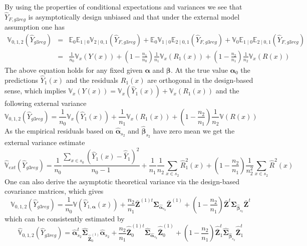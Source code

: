 \documentclass[a4paper,12pt,leqno, titlepage]{article}
\newcommand{\EX}{\mathbb{E}}
\newcommand{\VAR}{\mathbb{V}}
\begin{document}
By using the properties of conditional expectations and variances  we see that
$\hat{Y}_{F,g3reg}$ is asymptotically design unbiased and that under the external model assumption
one has
\begin{eqnarray}\label{extvaryg3reg1}
\VAR_{0,1,2}(\hat{Y}_{g3reg})&=&\EX_0 \EX_{1 \mid 0}\VAR_{2 \mid 0,1}(\hat{Y}_{F,g3reg})+
\EX_0 \VAR_{1 \mid 0}\EX_{2 \mid 0,1}(\hat{Y}_{F,g3reg})
+\VAR_0 \EX_{1 \mid 0}\EX_{2 \mid 0,1}(\hat{Y}_{F,g3reg})\nonumber \\
&=& \frac{1}{n_0}\VAR_{x}(Y(x))+(1-\frac{n_1}{n_0})\frac{1}{n_1}\VAR_x(R_1(x))+
(1-\frac{n_2}{n_1})\frac{1}{n_2}\VAR_x(R(x))
\end{eqnarray}
The above equation holds for any fixed given $\pmb{\alpha}$ and $\pmb{\beta}$. At the true  value $\pmb{\alpha}_0$ the predictions $\hat{Y}_1(x)$ and the residuals $R_1(x)$ are orthogonal in the design-based sense, which implies $\VAR_x(Y(x))=\VAR_x(\hat{Y}_1(x))+\VAR_x(R_1(x))$ and the following external variance
\begin{equation}\label{theoreticalexternalvaryg3reg}
\VAR_{0,1,2}(\hat{Y}_{g3reg})=\frac{1}{n_0}\VAR_{x}(\hat{Y}_1(x))+\frac{1}{n_1}\VAR_x(R_1(x))+
(1-\frac{n_2}{n_1})\frac{1}{n_2}\VAR(R(x))
\end{equation}
As the empirical residuals based on $\hat{\pmb{\alpha}}_{s_2}$ and $\hat{\pmb{\beta}}_{s_2}$ have zero mean we get the external variance estimate
\begin{equation}\label{estimatedexternalvaryg3reg}
\hat{\VAR}_{ext}(\hat{Y}_{g3reg})=\frac{1}{n_0}\frac{\sum_{x\in{s_0}}(\hat{Y}_1(x)-\hat{\bar{Y}}_1)^2}{n_0-1}
+ \frac{1}{n_1}\frac{1}{n_2}\sum_{x\in{s}_2}\hat{R}^2_1(x)+
(1-\frac{n_2}{n_1})\frac{1}{n^2_2}\sum_{x\in{s}_2}\hat{R}^2(x)
\end{equation}
One can also derive the asymptotic theoretical variance via the design-based covariance matrices, which gives
\begin{equation}\label{theoreticalgweightvaryg3reg}
\VAR_{0,1,2}(\hat{Y}_{g3reg})= \frac{1}{n_0}\VAR(\hat{Y}_{1,\pmb{\alpha}}(x))
+\frac{n_2}{n_1}\bar{\pmb{Z}}^{(1)t}
\pmb{\Sigma}_{\hat{\pmb{\alpha}}_{s_2}}\bar{\pmb{Z}}^{(1)} + (1-\frac{n_2}{n_1})\bar{\pmb{Z}}^{t}\pmb{\Sigma}_{\hat{\pmb{\beta}}_{s_2}}\bar{\pmb{Z}}^{t}
\end{equation}
which can be consistently estimated by
\begin{equation}\label{estgweightvaryg3reg}
\hat{\VAR}_{0,1,2}(\hat{Y}_{g3reg})=\hat{\pmb{\alpha}}_{s_2}^t\hat{\pmb{\Sigma}}_{\hat{\bar{\pmb{Z}}}^{(1)}_0}\hat{\pmb{\alpha}}_{s_2}
+\frac{n_2}{n_1}\hat{\bar{\pmb{Z}}}^{(1)t}_0
\hat{\pmb{\Sigma}}_{\hat{\pmb{\alpha}}_{s_2}}\hat{\bar{\pmb{Z}}}^{(1)}_0 + (1-\frac{n_2}{n_1})\hat{\bar{\pmb{Z}}}^{t}_1\hat{\pmb{\Sigma}}_{\hat{\pmb{\beta}}_{s_2}}\hat{\bar{\pmb{Z}}}^{t}_1
\end{equation}
\end{document}
